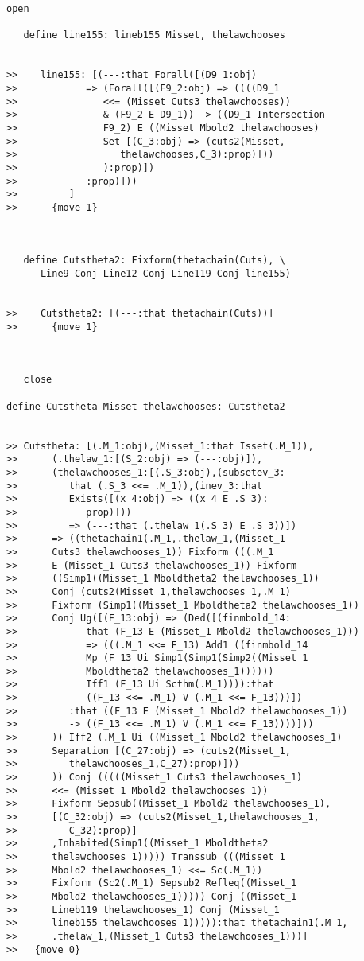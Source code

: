 \documentclass[12pt]{article}
\begin{document}
\begin{verbatim}
open

   define line155: lineb155 Misset, thelawchooses


>>    line155: [(---:that Forall([(D9_1:obj)
>>            => (Forall([(F9_2:obj) => ((((D9_1
>>               <<= (Misset Cuts3 thelawchooses))
>>               & (F9_2 E D9_1)) -> ((D9_1 Intersection
>>               F9_2) E ((Misset Mbold2 thelawchooses)
>>               Set [(C_3:obj) => (cuts2(Misset,
>>                  thelawchooses,C_3):prop)]))
>>               ):prop)])
>>            :prop)]))
>>         ]
>>      {move 1}



   define Cutstheta2: Fixform(thetachain(Cuts), \
      Line9 Conj Line12 Conj Line119 Conj line155)


>>    Cutstheta2: [(---:that thetachain(Cuts))]
>>      {move 1}



   close

define Cutstheta Misset thelawchooses: Cutstheta2


>> Cutstheta: [(.M_1:obj),(Misset_1:that Isset(.M_1)),
>>      (.thelaw_1:[(S_2:obj) => (---:obj)]),
>>      (thelawchooses_1:[(.S_3:obj),(subsetev_3:
>>         that (.S_3 <<= .M_1)),(inev_3:that
>>         Exists([(x_4:obj) => ((x_4 E .S_3):
>>            prop)]))
>>         => (---:that (.thelaw_1(.S_3) E .S_3))])
>>      => ((thetachain1(.M_1,.thelaw_1,(Misset_1
>>      Cuts3 thelawchooses_1)) Fixform (((.M_1
>>      E (Misset_1 Cuts3 thelawchooses_1)) Fixform
>>      ((Simp1((Misset_1 Mboldtheta2 thelawchooses_1))
>>      Conj (cuts2(Misset_1,thelawchooses_1,.M_1)
>>      Fixform (Simp1((Misset_1 Mboldtheta2 thelawchooses_1))
>>      Conj Ug([(F_13:obj) => (Ded([(finmbold_14:
>>            that (F_13 E (Misset_1 Mbold2 thelawchooses_1)))
>>            => (((.M_1 <<= F_13) Add1 ((finmbold_14
>>            Mp (F_13 Ui Simp1(Simp1(Simp2((Misset_1
>>            Mboldtheta2 thelawchooses_1))))))
>>            Iff1 (F_13 Ui Scthm(.M_1)))):that
>>            ((F_13 <<= .M_1) V (.M_1 <<= F_13)))])
>>         :that ((F_13 E (Misset_1 Mbold2 thelawchooses_1))
>>         -> ((F_13 <<= .M_1) V (.M_1 <<= F_13))))]))
>>      )) Iff2 (.M_1 Ui ((Misset_1 Mbold2 thelawchooses_1)
>>      Separation [(C_27:obj) => (cuts2(Misset_1,
>>         thelawchooses_1,C_27):prop)]))
>>      )) Conj (((((Misset_1 Cuts3 thelawchooses_1)
>>      <<= (Misset_1 Mbold2 thelawchooses_1))
>>      Fixform Sepsub((Misset_1 Mbold2 thelawchooses_1),
>>      [(C_32:obj) => (cuts2(Misset_1,thelawchooses_1,
>>         C_32):prop)]
>>      ,Inhabited(Simp1((Misset_1 Mboldtheta2
>>      thelawchooses_1))))) Transsub (((Misset_1
>>      Mbold2 thelawchooses_1) <<= Sc(.M_1))
>>      Fixform (Sc2(.M_1) Sepsub2 Refleq((Misset_1
>>      Mbold2 thelawchooses_1))))) Conj ((Misset_1
>>      Lineb119 thelawchooses_1) Conj (Misset_1
>>      lineb155 thelawchooses_1))))):that thetachain1(.M_1,
>>      .thelaw_1,(Misset_1 Cuts3 thelawchooses_1)))]
>>   {move 0}



\end{verbatim}
\end{document}
